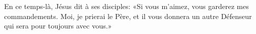 En ce temps-là, Jésus dit à ses disciples:
	«Si vous m’aimez, vous garderez mes commandements.
	Moi, je prierai le Père,
	et il vous donnera un autre Défenseur qui sera pour toujours avec vous.»
